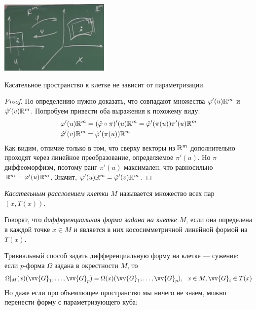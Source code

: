 \begin{center}
	\includegraphics[width=0.4\textwidth]{images/cell_tangent.png}
\end{center}

\begin{lemma} \label{tangent_space_vs_param}
	Касательное пространство к клетке не зависит от параметризации.
\end{lemma}

\begin{proof}
	По определению нужно доказать, что совпадают множества $\varphi'(u)\mathbb{R}^m$ и $\hat{\varphi}'(v)\mathbb{R}^m$. Попробуем привести оба выражения к похожему виду:
	\begin{align*}
		&{\varphi'(u)\mathbb{R}^m = (\hat{\varphi} \circ \pi)'(u)\mathbb{R}^m = \hat{\varphi}'(\pi(u))\pi'(u)\mathbb{R}^m}
		\\
		&{\hat{\varphi}'(v)\mathbb{R}^m = \hat{\varphi}'(\pi(u))\mathbb{R}^m}
	\end{align*}
	Как видим, отличие только в том, что сверху векторы из $\mathbb{R}^m$ дополнительно проходят через линейное преобразование, определяемое $\pi'(u)$. Но $\pi$ диффеоморфизм, поэтому ранг $\pi'(u)$ максимален, что равносильно $\mathbb{R}^m = \varphi'(u)\mathbb{R}^m$. Значит, $\varphi'(u)\mathbb{R}^m = \hat{\varphi}'(v)\mathbb{R}^m$.
\end{proof}

\begin{definition}
	\textit{Касательным расслоением клетки} $M$ называется множество всех пар $(x, T(x))$.
\end{definition}

\begin{definition}
	Говорят, что \textit{дифференциальная форма задана на клетке $M$}, если она определена в каждой точке $x \in M$ и является в них кососимметричной линейной формой на $T(x)$.
\end{definition}

\begin{note}
	Тривиальный способ задать дифференциальную форму на клетке --- сужение: если $p$-форма $\Omega$ задана в окрестности $M$, то
	\[
		\Omega|_M(x)(\vv{G}_1, \ldots, \vv{G}_p) = \Omega(x)(\vv{G}_1, \ldots, \vv{G}_p),\ \ x \in M, \vv{G}_i \in T(x)
	\]
	Но даже если про объемлющее пространство мы ничего не знаем, можно перенести форму с параметризующего куба: 
\end{note}

